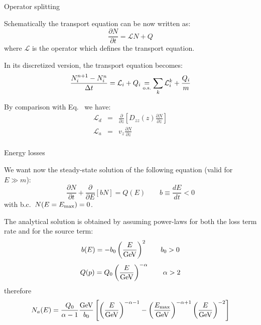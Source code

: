 \documentclass[9pt]{beamer}
\begin{document}
\begin{frame}{Operator splitting}

Schematically the transport equation can be now written as:
%
\begin{equation*}
\frac{\partial N}{\partial t} = {\mathcal L}N + Q
\end{equation*}
%
where ${\mathcal L}$ is the operator which defines the transport equation.

In its discretized version, the transport equation becomes:
%
\begin{equation*} 
\frac{N_i^{n+1} - N_i^n}{\Delta t} = {\mathcal L}_i + Q_i \underset{\rm o.s.}{=}
 \sum_k {\mathcal L}_i^k + \frac{Q_i}{m} 
\end{equation*}

By comparison with Eq.~ we have:
%
\begin{eqnarray*}
{\mathcal L}_d & = & \frac{\partial}{\partial z} \left[ D_{zz}(z) \frac{\partial N}{\partial z} \right]\\
{\mathcal L}_a & = & v_z \frac{\partial N}{\partial z} \\
\end{eqnarray*}

\end{frame}

\begin{frame}{Energy losses}

We want now the steady-state solution of the following equation (valid for $E \gg m$):
%
\begin{equation*}
\frac{\partial N}{\partial t} + \frac{\partial}{\partial E} \left[ b N \right] = Q(E) \qquad b \equiv \frac{dE}{dt} < 0
\end{equation*}
%
with b.c.~$N(E = E_{\rm max}) = 0$.

The analytical solution is obtained by assuming power-laws for both the loss term rate and for the source term:
%
\begin{equation*}
b(E) = -b_0 \left( \frac{E}{\rm GeV} \right)^2 \qquad b_0 > 0
\end{equation*}
%
\begin{equation*}
Q(p) = Q_0 \left( \frac{E}{\rm GeV} \right)^{-\alpha} \qquad \alpha > 2
\end{equation*}
%
therefore
%
\begin{equation*}
N_a(E) = \frac{Q_0}{\alpha - 1} \frac{\rm GeV}{b_0} \left[ \left( \frac{E}{\rm GeV} \right)^{-\alpha-1} - \left( \frac{E_{\rm max}}{\rm GeV} \right)^{-\alpha + 1} \left( \frac{E}{\rm GeV} \right)^{-2} \right]
\end{equation*}

\end{frame}
\end{document}

